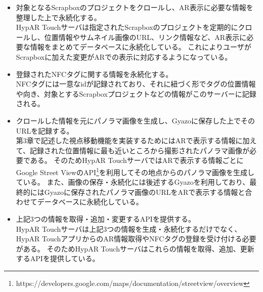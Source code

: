 \begin{itemize}
  \item 対象となるScrapboxのプロジェクトをクロールし、AR表示に必要な情報を整理した上で永続化する。\\
  HypAR Touchサーバは指定されたScrapboxのプロジェクトを定期的にクロールし、位置情報やサムネイル画像のURL、リンク情報など、AR表示に必要な情報をまとめてデータベースに永続化している。
  これによりユーザがScrapboxに加えた変更がARでの表示に対応するようになっている。
  \\
  \item 登録されたNFCタグに関する情報を永続化する。\\
  NFCタグには一意なidが記録されており、それに紐づく形でタグの位置情報や向き、対象とするScrapboxプロジェクトなどの情報がこのサーバーに記録される。
  \\
  \item クロールした情報を元にパノラマ画像を生成し、Gyazoに保存した上でそのURLを記録する。\\
  第3章で記述した視点移動機能を実装するためにはARで表示する情報に加えて、記録された位置情報に最も近いところから撮影されたパノラマ画像が必要である。
  そのためHypAR TouchサーバではARで表示する情報ごとにGoogle Street ViewのAPI\footnote{\textsf{https://developers.google.com/maps/documentation/streetview/overview}}を利用してその地点からのパノラマ画像を生成している。
  また、画像の保存・永続化には後述するGyazoを利用しており、最終的にはGyazoに保存されたパノラマ画像のURLをARで表示する情報と合わせてデータベースに永続化している。
  \\
  \item 上記3つの情報を取得・追加・変更するAPIを提供する。\\
  HypAR Touchサーバは上記3つの情報を生成・永続化するだけでなく、HypAR TouchアプリからのAR情報取得やNFCタグの登録を受け付ける必要がある。
  そのためHypAR Touchサーバはこれらの情報を取得、追加、更新するAPIを提供している。

\end{itemize}

